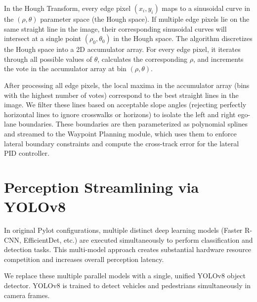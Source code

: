 \documentclass[11pt,a4paper]{report}
\begin{document}
In the Hough Transform, every edge pixel $(x_i, y_i)$ maps to a sinusoidal curve in the $(\rho, \theta)$ parameter space (the Hough space). If multiple edge pixels lie on the same straight line in the image, their corresponding sinusoidal curves will intersect at a single point $(\rho_0, \theta_0)$ in the Hough space. The algorithm discretizes the Hough space into a 2D accumulator array. For every edge pixel, it iterates through all possible values of $\theta$, calculates the corresponding $\rho$, and increments the vote in the accumulator array at bin $(\rho, \theta)$.

After processing all edge pixels, the local maxima in the accumulator array (bins with the highest number of votes) correspond to the best straight lines in the image. We filter these lines based on acceptable slope angles (rejecting perfectly horizontal lines to ignore crosswalks or horizons) to isolate the left and right ego-lane boundaries. These boundaries are then parameterized as polynomial splines and streamed to the Waypoint Planning module, which uses them to enforce lateral boundary constraints and compute the cross-track error for the lateral PID controller.

\section{Perception Streamlining via YOLOv8}
\label{sec:perception_streamlining}
In original Pylot configurations, multiple distinct deep learning models (Faster R-CNN, EfficientDet, etc.) are executed simultaneously to perform classification and detection tasks. This multi-model approach creates substantial hardware resource competition and increases overall perception latency.

We replace these multiple parallel models with a single, unified YOLOv8 object detector. YOLOv8 is trained to detect vehicles and pedestrians simultaneously in camera frames. 
\end{document}
